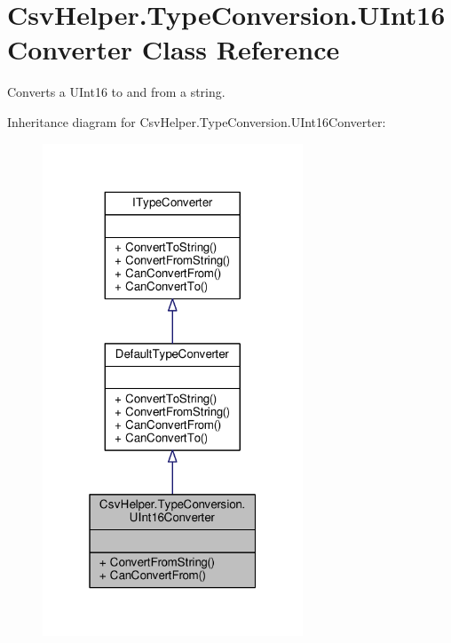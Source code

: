\hypertarget{a00158}{\section{Csv\-Helper.\-Type\-Conversion.\-U\-Int16\-Converter Class Reference}
\label{a00158}
}


Converts a U\-Int16 to and from a string.  




Inheritance diagram for Csv\-Helper.\-Type\-Conversion.\-U\-Int16\-Converter\-:
\nopagebreak
\begin{figure}[H]
\begin{center}
\leavevmode
\includegraphics[width=220pt]{d4/d1f/a00506}
\end{center}
\end{figure}


